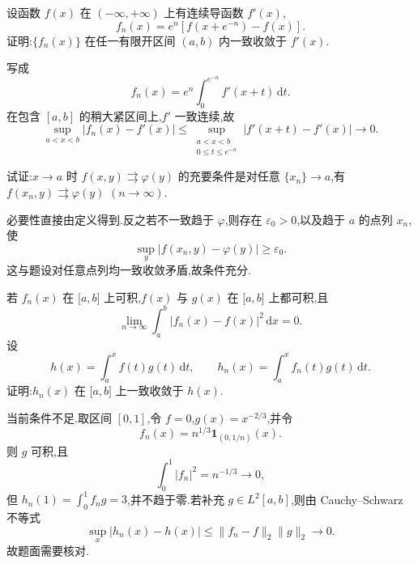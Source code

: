 \begin{example}
    设函数 $f(x)$ 在 $(-\infty,+\infty)$ 上有连续导函数 $f'(x)$,
    \[
        f_n(x)=e^n\left[f(x+e^{-n})-f(x)\right].
    \]
    证明:$\{f_n(x)\}$ 在任一有限开区间 $(a,b)$ 内一致收敛于 $f'(x)$.
\end{example}
\exampleblank

\begin{solution}
    写成
    \[
        f_n(x)=e^n\int_0^{e^{-n}}f'(x+t)\,\mathrm{d}t.
    \]
    在包含 $[a,b]$ 的稍大紧区间上,$f'$ 一致连续,故
    \[
        \sup_{a<x<b}|f_n(x)-f'(x)|
        \leq\sup_{\substack{a<x<b\\0\leq t\leq e^{-n}}}|f'(x+t)-f'(x)|\longrightarrow0.
    \]
\end{solution}

\begin{example}
    试证:$x\to a$ 时 $f(x,y)\rightrightarrows\varphi(y)$ 的充要条件是对任意 $\{x_n\}\to a$,有 $f(x_n,y)\rightrightarrows\varphi(y)$ $(n\to\infty)$.
\end{example}
\exampleblank

\begin{solution}
    必要性直接由定义得到.反之若不一致趋于 $\varphi$,则存在 $\varepsilon_0>0$,以及趋于 $a$ 的点列 $x_n$,使
    \[
        \sup_y|f(x_n,y)-\varphi(y)|\geq\varepsilon_0.
    \]
    这与题设对任意点列均一致收敛矛盾,故条件充分.
\end{solution}

\begin{example}
    若 $f_n(x)$ 在 $\lbrack a,b\rbrack$ 上可积,$f(x)$ 与 $g(x)$ 在 $\lbrack a,b\rbrack$ 上都可积,且
    \[
        \displaystyle\lim\limits_{n\to\infty}\int_a^b|f_n(x)-f(x)|^2\,\mathrm{d}x=0.
    \]
    设
    \[
        h(x)=\int_a^x f(t)g(t)\,\mathrm{d}t,
        \qquad
        h_n(x)=\int_a^x f_n(t)g(t)\,\mathrm{d}t.
    \]
    证明:$h_n(x)$ 在 $\lbrack a,b\rbrack$ 上一致收敛于 $h(x)$.
\end{example}
\exampleblank

\begin{solution}
    当前条件不足.取区间 $[0,1]$,令 $f=0$,$g(x)=x^{-2/3}$,并令
    \[
        f_n(x)=n^{1/3}\mathbf1_{(0,1/n)}(x).
    \]
    则 $g$ 可积,且
    \[
        \displaystyle\int_0^1|f_n|^2=n^{-1/3}\to0,
    \]
    但 $h_n(1)=\displaystyle\int_0^1f_ng=3$,并不趋于零.若补充 $g\in L^2[a,b]$,则由 Cauchy--Schwarz 不等式
    \[
        \sup_x|h_n(x)-h(x)|
        \leq\|f_n-f\|_2\|g\|_2\longrightarrow0.
    \]
    故题面需要核对.
\end{solution}

